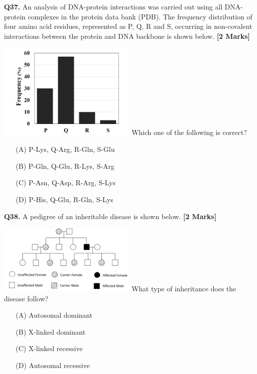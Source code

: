 \documentclass[11pt]{article}
\newcommand{\questionb}[2]{
    \noindent\textbf{Q#2.} #1 \hfill \textbf{[2 Marks]}
}
\begin{document}
\questionb{An analysis of DNA-protein interactions was carried out using all DNA-protein complexes in the protein data bank (PDB). The frequency distribution of four amino acid residues, represented as P, Q, R and S, occurring in non-covalent interactions between the protein and DNA backbone is shown below.}{37}
\includegraphics[width=0.5\textwidth]{figures/Q37}
Which one of the following is correct?
\begin{enumerate}
    \item[(A)] P-Lys, Q-Arg, R-Gln, S-Glu
    \item[(B)] P-Gln, Q-Glu, R-Lys, S-Arg
    \item[(C)] P-Asn, Q-Asp, R-Arg, S-Lys
    \item[(D)] P-His, Q-Glu, R-Gln, S-Lys
\end{enumerate}
\vspace{0.5cm}

\questionb{A pedigree of an inheritable disease is shown below.}{38}
\includegraphics[width=0.5\textwidth]{figures/Q38}
What type of inheritance does the disease follow?
\begin{enumerate}
    \item[(A)] Autosomal dominant
    \item[(B)] X-linked dominant
    \item[(C)] X-linked recessive
    \item[(D)] Autosomal recessive
\end{enumerate}
\vspace{0.5cm}
\end{document}
